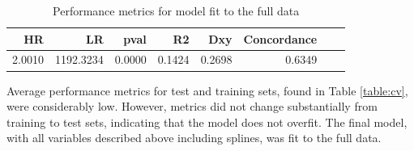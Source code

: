 \documentclass{article}
\begin{document}
\begin{table}[!htbp]
\centering
\caption{Performance metrics for model fit to the full data} 
\begin{tabular}{rrrrrrrr}
  \hline
  HR & LR & pval & R2 & Dxy & Concordance \\ 
  \hline
  2.0010 & 1192.3234 & 0.0000 & 0.1424 & 0.2698 & 0.6349 \\ 
   \hline
\end{tabular}
\label{table:finalmetrics}
\end{table}

Average performance metrics for test and training sets, found in Table \ref{table:cv}, were considerably low. However, metrics did not change substantially from training to test sets, indicating that the model does not overfit. The final model, with all variables described above including splines, was fit to the full data.
\end{document}
